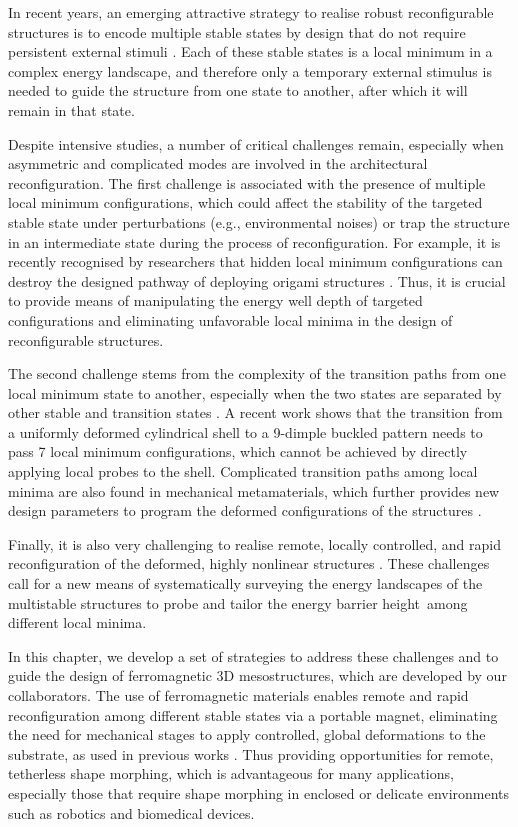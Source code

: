 In recent years, an emerging attractive strategy to realise robust reconfigurable structures is to encode multiple stable states by design that do not require persistent external stimuli \cite{Song2019,Yang2019,ODonnell2020,Li2020}.
Each of these stable states is a local minimum in a complex energy landscape, and therefore only a temporary external stimulus is needed to guide the structure from one state to another, after which it will remain in that state.

Despite intensive studies, a number of critical challenges remain, especially when asymmetric and complicated modes are involved in the architectural reconfiguration.
The first challenge is associated with the presence of multiple local minimum configurations, which could affect the stability of the targeted stable state under perturbations (e.g., environmental noises) or trap the structure in an intermediate state during the process of reconfiguration.
For example, it is recently recognised by researchers that hidden local minimum configurations can destroy the designed pathway of deploying origami structures \cite{Na2015,Silverberg2015}.
Thus, it is crucial to provide means of manipulating the energy well depth of targeted configurations and eliminating unfavorable local minima in the design of reconfigurable structures.

The second challenge stems from the complexity of the transition paths from one local minimum state to another, especially when the two states are separated by other stable and transition states \cite{Groh2019,Virot2017,Marthelot2017,Medina2020,Panter2019}.
A recent work \cite{Panter2019} shows that the transition from a uniformly deformed cylindrical shell to a 9-dimple buckled pattern needs to pass 7 local minimum configurations, which cannot be achieved by directly applying local probes to the shell.
Complicated transition paths among local minima are also found in mechanical metamaterials, which further provides new design parameters to program the deformed configurations of the structures \cite{Medina2020}.

Finally, it is also very challenging to realise remote, locally controlled, and rapid reconfiguration of the deformed, highly nonlinear structures \cite{Fu2018,Luo2019}.
These challenges call for a new means of systematically surveying the energy landscapes of the multistable structures to probe and tailor the energy barrier height among different local minima.

In this chapter, we develop a set of strategies to address these challenges and to guide the design of ferromagnetic 3D mesostructures, which are developed by our collaborators.
The use of ferromagnetic materials enables remote and rapid reconfiguration among different stable states via a portable magnet, eliminating the need for mechanical stages to apply controlled, global deformations to the substrate, as used in previous works \cite{Fu2018,Pang2020}.
Thus providing opportunities for remote, tetherless shape morphing, which is advantageous for many applications, especially those that require shape morphing in enclosed or delicate environments such as robotics and biomedical devices.


